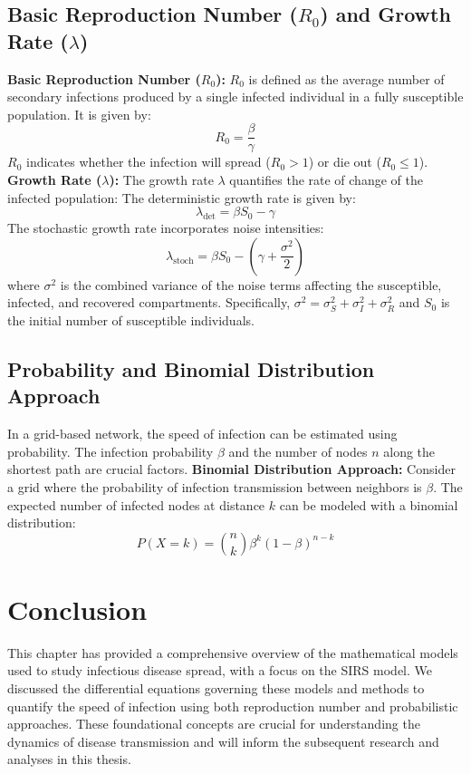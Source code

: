 \subsection{Basic Reproduction Number ($R_0$) and Growth Rate ($\lambda$)}
\textbf{Basic Reproduction Number ($R_0$):} $R_0$ is defined as the average number of secondary infections produced by a single infected individual in a fully susceptible population. It is given by:
\begin{equation}
R_0 = \frac{\beta}{\gamma}
\end{equation}
$R_0$ indicates whether the infection will spread ($R_0 > 1$) or die out ($R_0 \leq 1$).\\

\noindent
\textbf{Growth Rate ($\lambda$):} The growth rate $\lambda$ quantifies the rate of change of the infected population:
\noindent
The deterministic growth rate is given by:
\[ \lambda_{\text{det}} = \beta S_0 - \gamma \]
The stochastic growth rate incorporates noise intensities:
\[ \lambda_{\text{stoch}} = \beta S_0 - \left(\gamma + \frac{\sigma^2}{2}\right) \]
\noindent
where \(\sigma^2\) is the combined variance of the noise terms affecting the susceptible, infected, and recovered compartments. Specifically, \(\sigma^2 = \sigma_S^2 + \sigma_I^2 + \sigma_R^2\) and $S_0$ is the initial number of susceptible individuals.

\subsection{Probability and Binomial Distribution Approach}
In a grid-based network, the speed of infection can be estimated using probability. The infection probability $\beta$ and the number of nodes $n$ along the shortest path are crucial factors.
\noindent
\textbf{Binomial Distribution Approach:}
Consider a grid where the probability of infection transmission between neighbors is $\beta$. The expected number of infected nodes at distance $k$ can be modeled with a binomial distribution:
\begin{equation}
P(X = k) = \binom{n}{k} \beta^k (1 - \beta)^{n-k}
\end{equation}

\section{Conclusion}
This chapter has provided a comprehensive overview of the mathematical models used to study infectious disease spread, with a focus on the SIRS model. We discussed the differential equations governing these models and methods to quantify the speed of infection using both reproduction number and probabilistic approaches. These foundational concepts are crucial for understanding the dynamics of disease transmission and will inform the subsequent research and analyses in this thesis.